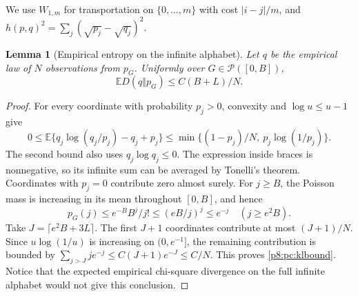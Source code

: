 \documentclass[11pt,a4paper]{article}
\newtheorem{lemma}[theorem]{Lemma}
\theoremstyle{definition}
\theoremstyle{remark}
\numberwithin{equation}{section}
\begin{document}
We use $W_{1,m}$ for transportation on $\{0,\ldots,m\}$ with cost
$|i-j|/m$, and $h(p,q)^2=\sum_j(\sqrt{p_j}-\sqrt{q_j})^2$.

\begin{lemma}[Empirical entropy on the infinite alphabet]\label{p8:pc:kl}
Let $q$ be the empirical law of $N$ observations from $p_G$.
Uniformly over $G\in\mathcal P([0,B])$,
\begin{equation}\label{p8:pc:klbound}
                    \mathbb E D(q\Vert p_G)\le C(B+L)/N.
\end{equation}
\end{lemma}
\begin{proof}
For every coordinate with probability $p_j>0$, convexity and
$\log u\le u-1$ give
\[
 0\le\mathbb E\{q_j\log(q_j/p_j)-q_j+p_j\}
 \le\min\{(1-p_j)/N,\ p_j\log(1/p_j)\}.
\]
The second bound also uses $q_j\log q_j\le0$.  The expression inside
braces is nonnegative, so its infinite sum can be averaged by
Tonelli's theorem.  Coordinates with $p_j=0$ contribute zero almost
surely.  For $j\ge B$, the Poisson mass is increasing in its mean
throughout $[0,B]$, and hence
\[
 p_G(j)\le e^{-B}B^j/j!\le(eB/j)^j\le e^{-j}
                         \quad(j\ge e^2B).
\]
Take $J=\lceil e^2B+3L\rceil$.  The first $J+1$ coordinates
contribute at most $(J+1)/N$.  Since $u\log(1/u)$ is increasing
on $(0,e^{-1}]$, the remaining contribution is bounded by
$\sum_{j>J}j e^{-j}\le C(J+1)e^{-J}\le C/N$.
This proves \eqref{p8:pc:klbound}.  Notice that the expected empirical
chi-square divergence on the full infinite alphabet would not give
this conclusion.
\end{proof}
\end{document}
